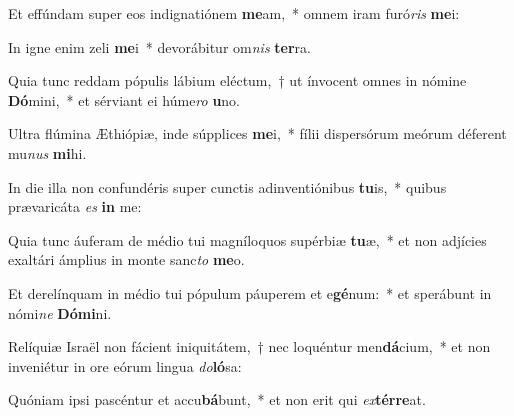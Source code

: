 \item Et effúndam super eos indignatiónem \textbf{me}am,~* omnem iram furó\textit{ris} \textbf{me}i:
\item In igne enim zeli \textbf{me}i~* devorábitur om\textit{nis} \textbf{ter}ra.
\item Quia tunc reddam pópulis lábium eléctum,~† ut ínvocent omnes in nómine \textbf{Dó}mini,~* et sérviant ei húme\textit{ro} \textbf{u}no.
\item Ultra flúmina Æthiópiæ, inde súpplices \textbf{me}i,~* fílii dispersórum meórum déferent mu\textit{nus} \textbf{mi}hi.
\item In die illa non confundéris super cunctis adinventiónibus \textbf{tu}is,~* quibus prævaricáta \textit{es} \textbf{in} me:
\item Quia tunc áuferam de médio tui magníloquos supérbiæ \textbf{tu}æ,~* et non adjícies exaltári ámplius in monte sanc\textit{to} \textbf{me}o.
\item Et derelínquam in médio tui pópulum páuperem et e\textbf{gé}num:~* et sperábunt in nómi\textit{ne} \textbf{Dó}\textbf{mi}ni.
\item Relíquiæ Israël non fácient iniquitátem,~† nec loquéntur men\textbf{dá}cium,~* et non inveniétur in ore eórum lingua \textit{do}\textbf{ló}sa:
\item Quóniam ipsi pascéntur et accu\textbf{bá}bunt,~* et non erit qui \textit{ex}\textbf{tér}\textbf{re}at.
